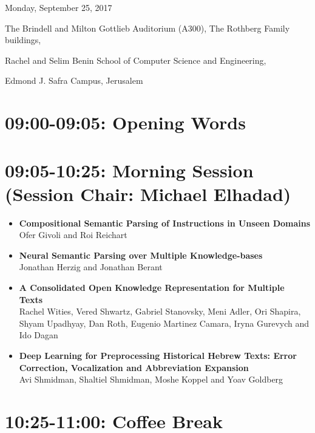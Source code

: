 \documentclass[a0,portrait]{a0poster}
\begin{document}
    \begin{minipage}{.77\textwidth}
    {\fontsize{60pt}{70pt}\selectfont
    Monday, September 25, 2017

    \fontsize{40pt}{60pt}\selectfont
    The Brindell and Milton Gottlieb Auditorium (A300), The Rothberg Family buildings,

    Rachel and Selim Benin School of Computer Science and Engineering,

    Edmond J. Safra Campus, Jerusalem

    }


        \section*{09:00-09:05: Opening Words}

        \section*{09:05-10:25: Morning Session (Session Chair: Michael Elhadad)}

        \begin{itemize}
            \item\LARGE
            \textbf{Compositional Semantic Parsing of Instructions in Unseen
            Domains}\\
            \Large Ofer Givoli and Roi Reichart
            \item\LARGE
            \textbf{Neural Semantic Parsing over Multiple Knowledge-bases}\\
            \Large Jonathan Herzig and Jonathan Berant
            \item\LARGE
            \textbf{A Consolidated Open Knowledge Representation for Multiple
            Texts}\\
            \Large Rachel Wities, Vered Shwartz, Gabriel Stanovsky, Meni Adler, Ori
            Shapira, Shyam Upadhyay, Dan Roth, Eugenio Martinez Camara, Iryna
            Gurevych and Ido Dagan
            \item\LARGE
            \textbf{Deep Learning for Preprocessing Historical Hebrew Texts: Error
            Correction, Vocalization and Abbreviation Expansion}\\
            \Large Avi Shmidman, Shaltiel Shmidman, Moshe Koppel and Yoav Goldberg
        \end{itemize}

        \section*{10:25-11:00: Coffee Break}
    \end{minipage}
\end{document}
